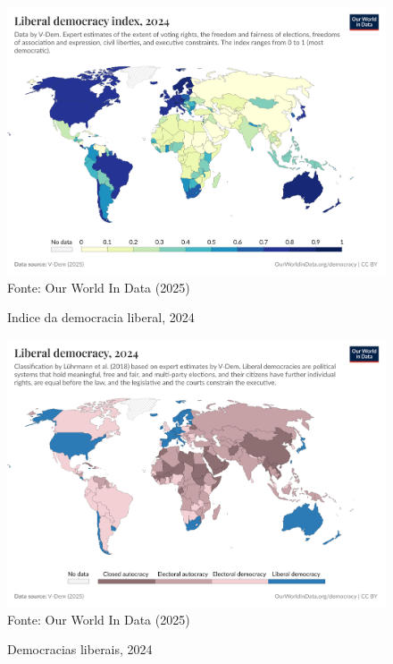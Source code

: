\begin{figure}[ht]
    \centering
    \caption{Indice da democracia liberal, 2024}
    \includegraphics[width=1\linewidth]{figuras/democracia/liberal-democracy-index.png}
    \label{fig:liberal-democracy-index}
    \footnotesize{Fonte: Our World In Data (2025)}
\end{figure}

\begin{figure}[ht]
    \centering
    \caption{Democracias liberais, 2024}
    \includegraphics[width=1\linewidth]{figuras/democracia/liberal-democracy-row.png}
    \label{fig:liberal-democracy-row}
    \footnotesize{Fonte: Our World In Data (2025)}
\end{figure}


